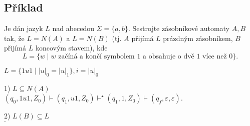 \subsection{Příklad}
Je dán jazyk $L$ nad abecedou $\Sigma = \{a,b\}$. Sestrojte zásobníkové automaty $A,B$ tak, že $L = N(A)$ a $L = N(B)$ 
(tj. $A$ přijímá $L$ prázdným zásobníkem, $B$ přijímá $L$ koncovým stavem), kde
\[L = \{w \mid w \text{ začíná a končí symbolem } 1 \text{ a obsahuje o dvě } 1 \text{ více než } 0\}\text{.}\]
\begin{multicols}{2}
    $L = \{1u1 \mid |u|_0 = |u|_1\}, i = |u|_0$


    \columnbreak

    1) $L \subseteq N(A)$\\
    $(q_0, 1u1, Z_0) \vdash (q_1, u1, Z_0) \vdash^\star (q_1, 1, Z_0) \vdash (q_f, \varepsilon, \varepsilon)$.

    2) $L(B) \subseteq L$\\

    $.$

\end{multicols}


